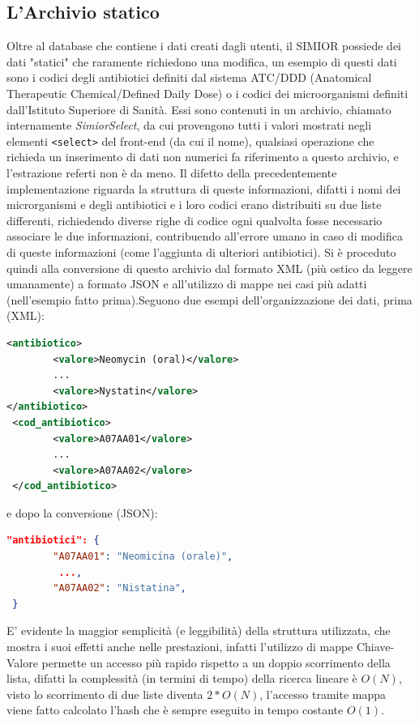 \subsection{L'Archivio statico}
Oltre al database che contiene i dati creati dagli utenti, il SIMIOR possiede dei dati "statici" che raramente richiedono una modifica, un esempio di questi dati sono i codici degli antibiotici definiti dal sistema ATC/DDD (Anatomical Therapeutic Chemical/Defined Daily Dose) o i codici dei microorganismi definiti dall'Istituto Superiore di Sanità.
Essi sono contenuti in un archivio, chiamato internamente \textit{SimiorSelect}, da cui provengono tutti i valori mostrati negli elementi \texttt{<select>} del front-end (da cui il nome), qualsiasi operazione che richieda un inserimento di dati non numerici fa riferimento a questo archivio, e l'estrazione referti non è da meno. Il difetto della precedentemente implementazione riguarda la struttura di queste informazioni, difatti i nomi dei microrganismi e degli antibiotici e i loro codici erano distribuiti su due liste differenti, richiedendo diverse righe di codice ogni qualvolta fosse necessario associare le due informazioni, contribuendo all'errore umano in caso di modifica di queste informazioni (come l'aggiunta di ulteriori antibiotici).
Si è proceduto quindi alla conversione di questo archivio dal formato XML (più ostico da leggere umanamente) a formato JSON e all'utilizzo di mappe nei casi più adatti (nell'esempio fatto prima).Seguono due esempi dell'organizzazione dei dati, prima (XML):
\begin{lstlisting}[language=xml]
<antibiotico>
        <valore>Neomycin (oral)</valore>
        ...
        <valore>Nystatin</valore>
</antibiotico>
 <cod_antibiotico>
        <valore>A07AA01</valore>
        ...
        <valore>A07AA02</valore>
 </cod_antibiotico>
\end{lstlisting}
e dopo la conversione (JSON):
\begin{lstlisting}[language=json]
  "antibiotici": {
        "A07AA01": "Neomicina (orale)",
         ...,
        "A07AA02": "Nistatina",
 }
\end{lstlisting}
E' evidente la maggior semplicità (e leggibilità) della struttura utilizzata, che mostra i suoi effetti anche nelle prestazioni, infatti l'utilizzo di mappe Chiave-Valore permette un accesso più rapido rispetto a un doppio scorrimento della lista, difatti la complessità (in termini di tempo) della ricerca lineare è $O(N)$, visto lo scorrimento di due liste diventa $2*O(N)$, l'accesso tramite mappa viene fatto calcolato l'hash che è sempre eseguito in tempo costante $O(1)$.
